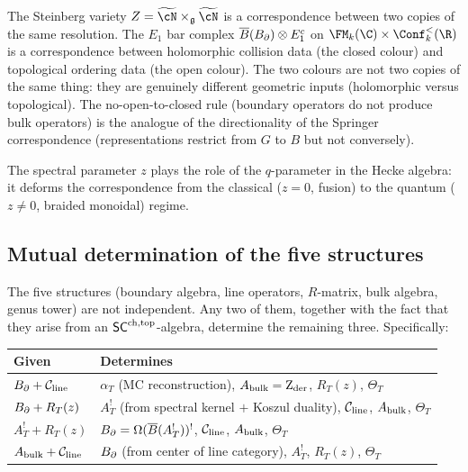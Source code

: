 \begin{remark}
The Steinberg variety $Z=\widetilde{\cN}\times_{\mathfrak{g}}
\widetilde{\cN}$ is a correspondence between two copies of the
same resolution. The $E_1$ bar complex
$\overline{B}(B_{\partial})\otimes E_1^c$ on
$\FM_k(\C)\times\Conf_k^{<}(\R)$ is a correspondence between
holomorphic collision data (the closed colour) and topological
ordering data (the open colour). The two colours are not
two copies of the same thing: they are genuinely different
geometric inputs (holomorphic versus topological). The
no-open-to-closed rule (boundary operators do not produce bulk
operators) is the analogue of the directionality of the Springer
correspondence (representations restrict from $G$ to $B$ but
not conversely).

The spectral parameter $z$ plays the role of the $q$-parameter
in the Hecke algebra: it deforms the correspondence from the
classical ($z=0$, fusion) to the quantum ($z\neq 0$, braided
monoidal) regime.
\end{remark}


\subsection{Mutual determination of the five structures}

\begin{corollary}
The five structures \textup{(}boundary algebra, line operators,
$R$-matrix, bulk algebra, genus tower\textup{)} are not
independent. Any two of them, together with the fact that they
arise from an $\mathsf{SC}^{\mathrm{ch,top}}$-algebra, determine the remaining three.
Specifically:
\begin{center}
\renewcommand{\arraystretch}{1.3}
\begin{tabular}{lp{9cm}}
\textbf{Given} & \textbf{Determines} \\
\hline
$B_{\partial} + \mathcal C_{\mathrm{line}}$
& $\alpha_T$ (MC reconstruction),
$A_{\mathrm{bulk}}=\operatorname{Z}_{\mathrm{der}}$, $R_T(z)$, $\Theta_T$ \\
$B_{\partial} + R_T(z)$
& $A^!_T$ (from spectral kernel $+$ Koszul duality),
$\mathcal C_{\mathrm{line}}$, $A_{\mathrm{bulk}}$, $\Theta_T$ \\
$A^!_T + R_T(z)$
& $B_{\partial}=\operatorname{\Omega}(\overline{B}(A^!_T))^!$,
$\mathcal C_{\mathrm{line}}$, $A_{\mathrm{bulk}}$, $\Theta_T$ \\
$A_{\mathrm{bulk}} + \mathcal C_{\mathrm{line}}$
& $B_{\partial}$ (from center of line category),
$A^!_T$, $R_T(z)$, $\Theta_T$
\end{tabular}
\end{center}
\end{corollary}

